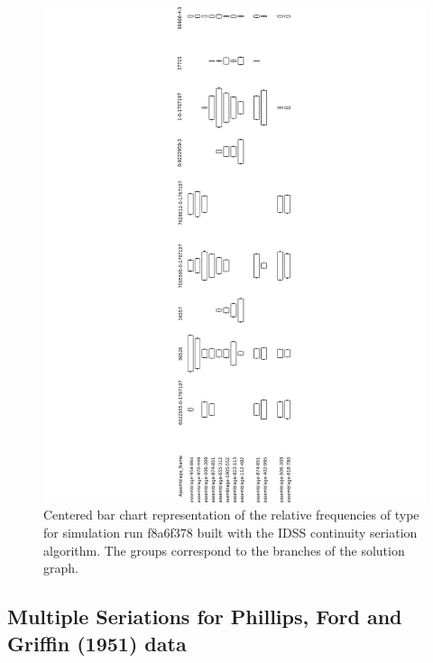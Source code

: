 \documentclass[graybox,natbib]{svmult}
\begin{document}
\begin{figure}[ht]
\centering
\includegraphics[scale=0.5]{continuity.pdf}
\caption{Centered bar chart representation of the relative frequencies of type for simulation run f8a6f378 built with the IDSS continuity seriation algorithm. The groups correspond to the branches of the solution graph.}
\label{img:continuity}
\end{figure}

\subsection{Multiple Seriations for Phillips, Ford and Griffin (1951)
data}\label{multiple-seriations-for-phillips-ford-and-griffin-1951-data}
\end{document}
